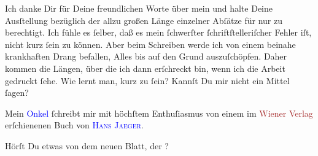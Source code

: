 \pstart
           Ich danke Dir für Deine freundlichen Worte über mein \label{K_L03198-8v}\label{K_L03198-8h} und halte Deine Ausſtellung bezüglich der
               allzu großen Länge einzelner Abſätze für nur zu berechtigt. Ich fühle es ſelber, daß
               es mein ſchwerſter ſchriftſtelleriſcher Fehler iſt, nicht kurz ſein zu können. Aber
               beim Schreiben werde ich von einem beinahe krankhaften Drang befallen, Alles bis auf
               den Grund auszuſchöpfen. {\pb}Daher kommen die Längen,
               über die ich dann erſchreckt bin, wenn ich die Arbeit gedruckt ſehe. Wie lernt man,
               kurz zu ſein? Kannſt Du mir nicht ein Mittel ſagen?\pend
           
\pstart
           Mein \textcolor{blue}{Onkel}{}\ledrightnote{{$\rightarrow$}\textcolor{blue}{Fedor Mamroth}} ſchreibt mir mit
               höchſtem Enthuſiasmus von einem im \textcolor{brown}{Wiener Verlag}{}\ledrightnote{\textcolor{brown}{Wiener Verlag}}
               erſchienenen Buch \label{K_L03198-9v}\label{K_L03198-9h} von
                  \textsc{\textcolor{blue}{Hans Jaeger}{}\ledrightnote{\textcolor{blue}{Hans Jæger}}}.\pend
           
\pstart
           Hörſt Du etwas von dem neuen Blatt, der \label{K_L03198-10v}\label{K_L03198-10h}?\pend
           
